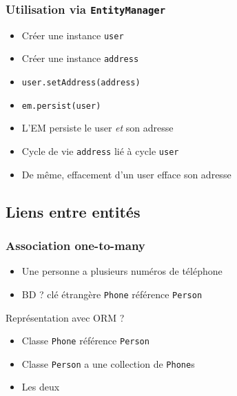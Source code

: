 \documentclass[english, french]{beamer}
\begin{document}
\begin{frame}
	\frametitle{Utilisation via \texttt{EntityManager}}
	\begin{itemize}
		\item Créer une instance \texttt{user}
		\item Créer une instance \texttt{address}
		\item \texttt{user.setAddress(address)}
		\item \texttt{em.persist(user)}
		\item L’EM persiste le user \emph{et} son adresse
		\item Cycle de vie \texttt{address} lié à cycle \texttt{user}
		\item De même, effacement d’un user efface son adresse
	\end{itemize}
\end{frame}

\subsection{Liens entre entités}
\begin{frame}
	\frametitle{Association one-to-many}
	\begin{itemize}
		\item Une personne a plusieurs numéros de téléphone
		\item BD ? \pause clé étrangère \texttt{Phone} référence \texttt{Person}
	\end{itemize}
	\pause
	
	\vspace{1em}
	Représentation avec ORM ? \pause
	\begin{itemize}
		\item Classe \texttt{Phone} référence \texttt{Person}
		\item Classe \texttt{Person} a une collection de \texttt{Phone}s
		\item Les deux
	\end{itemize}
\end{frame}
\end{document}
